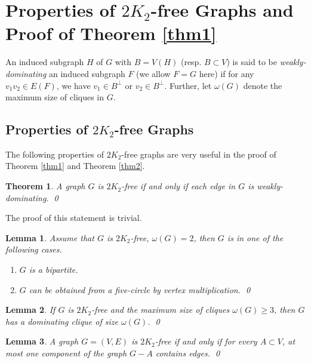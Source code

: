 \documentclass{amsart}
\newtheorem{theorem}{Theorem}
\newtheorem{lemma}{Lemma}
\begin{document}
\section{Properties of $2K_2$-free Graphs and Proof of Theorem \ref{thm1}}
An induced subgraph $H$ of $G$ with $B=V(H)$ (resp. $B\subset V$) is said to be {\em weakly-dominating}
an induced subgraph $F$ (we allow $F=G$ here) 
if for any $v_1v_2\in E(F)$, we have $v_1\in B^\perp$ or $v_2\in B^\perp$.
Further, let $\omega(G)$ denote the maximum size of cliques in $G$. 

\subsection{Properties of $2K_2$-free Graphs}
The following properties of $2K_2$-free graphs are very useful in the proof of Theorem \ref{thm1} and Theorem \ref{thm2}.

\begin{theorem}\label{trivial}
A graph $G$ is $2K_2$-free if and only if each edge in $G$ is weakly-dominating. \qed
\end{theorem}
The proof of this statement is trivial.

\begin{lemma}\label{lm1}{\cite[Theorem 2.]{chung1990maximum}\cite[Lemma 2.]{broersma2014toughness}}
Assume that $G$ is $2K_2$-free, $\omega(G)=2$, then $G$ is in one of the following cases.
\begin{enumerate}
\item $G$ is a bipartite.
\item $G$ can be obtained from a five-circle by vertex multiplication. \qed
\end{enumerate}
\end{lemma}



\begin{lemma}\label{lm2}{\cite[Theorem 3.]{chung1990maximum}}
If $G$ is $2K_2$-free and the maximum size of cliques $\omega(G)\ge3$, then $G$ has a dominating clique of size $\omega(G)$. \qed
\end{lemma}

\begin{lemma}\label{lm3}{\cite[Observation 1.]{broersma2014toughness}}
A graph $G=(V,E)$ is $2K_2$-free if and only if for every $A\subset V$, at most one component of the graph $G-A$ contains edges. \qed
\end{lemma}
\end{document}
